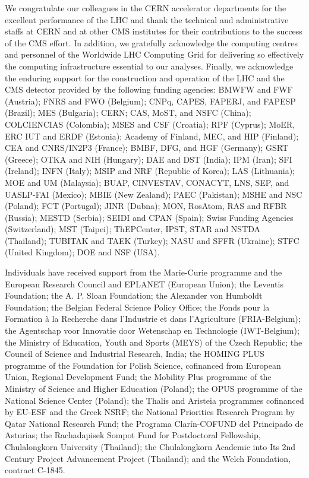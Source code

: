 \begin{acknowledgments}

  We congratulate our colleagues in the CERN accelerator departments
  for the excellent performance of the LHC and thank the technical and
  administrative staffs at CERN and at other CMS institutes for their
  contributions to the success of the CMS effort. In addition, we
  gratefully acknowledge the computing centres and personnel of the
  Worldwide LHC Computing Grid for delivering so effectively the
  computing infrastructure essential to our analyses. Finally, we
  acknowledge the enduring support for the construction and operation
  of the LHC and the CMS detector provided by the following funding
  agencies: BMWFW and FWF (Austria); FNRS and FWO (Belgium); CNPq,
  CAPES, FAPERJ, and FAPESP (Brazil); MES (Bulgaria); CERN; CAS, MoST,
  and NSFC (China); COLCIENCIAS (Colombia); MSES and CSF (Croatia);
  RPF (Cyprus); MoER, ERC IUT and ERDF (Estonia); Academy of Finland,
  MEC, and HIP (Finland); CEA and CNRS/IN2P3 (France); BMBF, DFG, and
  HGF (Germany); GSRT (Greece); OTKA and NIH (Hungary); DAE and DST
  (India); IPM (Iran); SFI (Ireland); INFN (Italy); MSIP and NRF
  (Republic of Korea); LAS (Lithuania); MOE and UM (Malaysia); BUAP,
  CINVESTAV, CONACYT, LNS, SEP, and UASLP-FAI (Mexico); MBIE (New
  Zealand); PAEC (Pakistan); MSHE and NSC (Poland); FCT (Portugal);
  JINR (Dubna); MON, RosAtom, RAS and RFBR (Russia); MESTD (Serbia);
  SEIDI and CPAN (Spain); Swiss Funding Agencies (Switzerland); MST
  (Taipei); ThEPCenter, IPST, STAR and NSTDA (Thailand); TUBITAK and
  TAEK (Turkey); NASU and SFFR (Ukraine); STFC (United Kingdom); DOE
  and NSF (USA).

  Individuals have received support from the Marie-Curie programme and
  the European Research Council and EPLANET (European Union); the
  Leventis Foundation; the A. P. Sloan Foundation; the Alexander von
  Humboldt Foundation; the Belgian Federal Science Policy Office; the
  Fonds pour la Formation \`a la Recherche dans l'Industrie et dans
  l'Agriculture (FRIA-Belgium); the Agentschap voor Innovatie door
  Wetenschap en Technologie (IWT-Belgium); the Ministry of Education,
  Youth and Sports (MEYS) of the Czech Republic; the Council of
  Science and Industrial Research, India; the HOMING PLUS programme of
  the Foundation for Polish Science, cofinanced from European Union,
  Regional Development Fund; the Mobility Plus programme of the
  Ministry of Science and Higher Education (Poland); the OPUS
  programme of the National Science Center (Poland); the Thalis and
  Aristeia programmes cofinanced by EU-ESF and the Greek NSRF; the
  National Priorities Research Program by Qatar National Research
  Fund; the Programa Clar\'in-COFUND del Principado de Asturias; the
  Rachadapisek Sompot Fund for Postdoctoral Fellowship, Chulalongkorn
  University (Thailand); the Chulalongkorn Academic into Its 2nd
  Century Project Advancement Project (Thailand); and the Welch
  Foundation, contract C-1845.

\end{acknowledgments}


